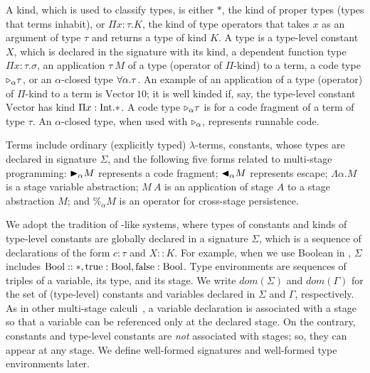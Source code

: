 


A kind, which is used to classify types, is either $*$, the kind of
proper types (types that terms inhabit), or $\Pi x\colon\tau.K$, the kind
of type operators that takes $x$ as an argument of type $\tau$ and returns a type
of kind $K$.
A type is a type-level constant $X$, which is declared in the signature with its kind, a dependent function type $\Pi x:\tau.\sigma$,
an application $\tau\ M$ of a type (operator of $\Pi$-kind) to a term, a code type ${\mathop{\triangleright}}_\alpha \tau$, or an $\alpha$-closed type $\forall\alpha.\tau$.
An example of an application of a type (operator) of $\Pi$-kind to a term is $\text{Vector}\ 10$; it is well kinded
if, say, the type-level constant $\text{Vector}$ has kind $\Pi x:\textrm{Int}.*$.
A code type ${\mathop{\triangleright}}_\alpha \tau$ is for a code fragment of a term of type $\tau$.
An $\alpha$-closed type, when used with ${\mathop{\triangleright}}_\alpha$, represents runnable code.



Terms include ordinary (explicitly typed) \(\lambda\)-terms, constants,
whose types are declared in signature $\Sigma$, and the following five forms
related to multi-stage programming:
${\mathop{\blacktriangleright}}_\alpha M$ represents a code fragment; ${\mathop{\blacktriangleleft}}_\alpha M$ represents escape;
$\Lambda\alpha.M$ is a stage variable abstraction;
$M\ A$ is an application of stage $A$ to a stage abstraction $M$; and
$\%_\alpha M$ is an operator for cross-stage persistence.


We adopt the tradition of \LLF-like systems, where types of constants and
kinds of type-level constants are globally declared in a signature $\Sigma$,
which is a sequence of declarations of the form $c:\tau$ and $X::K$. For
example, when we use Boolean in \LMD, $\Sigma$ includes $\textrm{Bool} :: *,
\textrm{true}:\textrm{Bool}, \textrm{false}:\textrm{Bool}$. Type environments are sequences of
triples of a variable, its type, and its stage. We write
\(\textit{dom}(\Sigma)\) and \(\textit{dom}(\Gamma)\) for the set of
(type-level) constants and variables declared in \(\Sigma\) and \(\Gamma\),
respectively. As in other multi-stage
calculi~\cite{taha2003environment,Tsukada,Hanada2014}, a variable declaration
is associated with a stage so that a variable can be referenced only at the
declared stage. On the contrary, constants and type-level constants are
\emph{not} associated with stages; so, they can appear at any stage. We
define well-formed signatures and well-formed type environments later.

